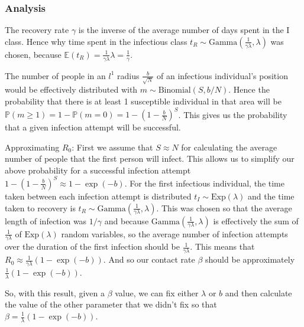 \documentclass[11pt]{article}
\begin{document}
\subsubsection*{Analysis}
The recovery rate $\gamma$ is the inverse of the average number of days spent in the I class. Hence why time spent in the infectious class $t_R \sim \text{Gamma}(\frac{1}{\gamma\lambda}, \lambda)$ was chosen, because $\mathbb{E}(t_R)=\frac{1}{\gamma\lambda} \lambda=\frac{1}{\gamma}$.

The number of people in an $l^1$ radius $\frac{b}{\sqrt{N}}$ of an infectious individual's position would be effectively distributed with $m\sim \text{Binomial}(S,b/N)$. Hence the probability that there is at least 1 susceptible individual in that area will be $\mathbb{P}(m\geq 1) = 1-\mathbb{P}(m=0) = 1-(1-\frac{b}{N})^S$. This gives us the probability that a given infection attempt will be successful.

Approximating $R_0$: First we assume that $S\approx N$ for calculating the average number of people that the first person will infect. This allows us to simplify our above probability for a successful infection attempt $1-(1-\frac{b}{N})^S\approx 1-\exp(-b)$. For the first infectious individual, the time taken between each infection attempt is distributed $t_I\sim \text{Exp}(\lambda)$ and the time taken to recovery is $t_R \sim \text{Gamma}(\frac{1}{\gamma\lambda}, \lambda)$. This was chosen so that the average length of infection was $1/\gamma$ and because $\text{Gamma}(\frac{1}{\gamma\lambda}, \lambda)$ is effectively the sum of $\frac{1}{\gamma\lambda}$ of $\text{Exp}(\lambda)$ random variables, so the average number of infection attempts over the duration of the first infection should be $\frac{1}{\gamma\lambda}$. This means that $R_0\approx\frac{1}{\gamma\lambda}(1-\exp(-b))$. And so our contact rate $\beta$ should be approximately $\frac{1}{\lambda}(1-\exp(-b))$.

So, with this result, given a $\beta$ value, we can fix either $\lambda$ or $b$ and then calculate the value of the other parameter that we didn't fix so that $\beta = \frac{1}{\lambda}(1-\exp(-b))$.
\end{document}
